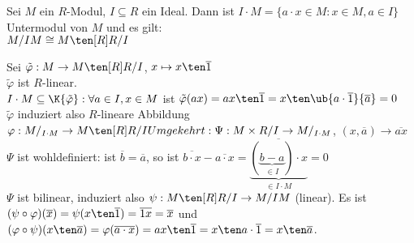 \begin{Prop}
  Sei $M$ ein $R$-Modul, $I \subseteq R$ ein Ideal. Dann ist $I \cdot M = 
  \{ a \cdot x \in M: x \in M, a \in I \}$ Untermodul von $M$ und es gilt: \\
  $M/IM \cong M \ten[R] R/I$
\end{Prop}

\begin{Bew}
  Sei $\tilde{\varphi}: M \rightarrow M \ten[R] R/I$, 
  $ x \mapsto x \ten \overline 1$\\
  $\tilde{\varphi}$  ist $R$-linear.\\
  $I \cdot M \subseteq \K{\tilde{\varphi}}: \forall a \in I, x \in M$ ist
  $\tilde{\varphi}(ax) = ax \ten \overline 1 = x \ten \ub{ a \cdot \overline 1
  }{\overline a} = 0$\\
  $\tilde{\varphi}$ induziert also $R$-lineare Abbildung\\
  $\varphi: M/_{I \cdot M} \rightarrow M \ten[R] R/I\\
  Umgekehrt: \Psi: M \times R/I \rightarrow M /_{I \cdot M}$, $(x, \overline a) \rightarrow \overline{ax}$ \\
  $\Psi$ ist wohldefiniert: ist $\overline b = \overline a$, so ist $\overline{b \cdot x} - \overline{a \cdot x} =
  \overline{ \underbrace {( \underbrace{b-a}_{\in I}) \cdot x}_{ \in I \cdot M}} =0$\\
  $\Psi$ ist bilinear, induziert also $\psi: M \ten[R] R/I \to M/IM$ (linear). Es ist 
  $(\psi \circ \varphi)(\overline x )= \psi(x \ten \overline 1 ) =
  \overline{1x} = \overline x$ und
  $(\varphi \circ \psi)(x \ten \overline a ) = \varphi(\overline{a \cdot x }) =
  ax \ten \overline 1 = x \ten a\cdot \overline 1 = x \ten \overline a$.
\end{Bew}
